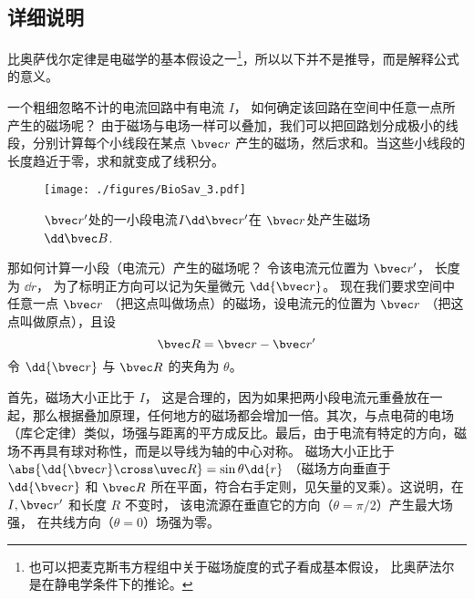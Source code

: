 \subsection{详细说明}
比奥萨伐尔定律是电磁学的基本假设之一\footnote{也可以把麦克斯韦方程组中关于磁场旋度的式子看成基本假设， 比奥萨法尔是在静电学条件下的推论。}，所以以下并不是推导，而是解释公式的意义。

一个粗细忽略不计的电流回路中有电流 $I$， 如何确定该回路在空间中任意一点所产生的磁场呢？ 由于磁场与电场一样可以叠加，我们可以把回路划分成极小的线段，分别计算每个小线段在某点 $\bvec r$ 产生的磁场，然后求和。当这些小线段的长度趋近于零，求和就变成了线积分。

\begin{figure}[ht]
\centering
\texttt{[image: ./figures/BioSav\_3.pdf]}
\caption{$\bvec r'$处的一小段电流$I \dd \bvec r'$在 $\bvec r$处产生磁场 $\dd \bvec B$.} \label{BioSav_fig3}
\end{figure}

那如何计算一小段（电流元）产生的磁场呢？ 令该电流元位置为 $\bvec r'$， 长度为 $\dd{r}$， 为了标明正方向可以记为矢量微元 $\dd{\bvec r}$。 现在我们要求空间中任意一点 $\bvec r$ （把这点叫做场点）的磁场，设电流元的位置为 $\bvec r$ （把这点叫做原点），且设
\begin{equation}
\bvec R = \bvec r - \bvec r'
\end{equation}
令 $\dd{\bvec r}$ 与 $\bvec R$ 的夹角为 $\theta$。

首先，磁场大小正比于 $I$， 这是合理的，因为如果把两小段电流元重叠放在一起，那么根据叠加原理，任何地方的磁场都会增加一倍。其次，与点电荷的电场（库仑定律）类似，场强与距离的平方成反比。最后，由于电流有特定的方向，磁场不再具有球对称性，而是以导线为轴的中心对称。 磁场大小正比于 $\abs{\dd{\bvec r} \cross \uvec R} = \sin\theta \dd{r}$ （磁场方向垂直于 $\dd{\bvec r}$ 和 $\bvec R$ 所在平面，符合右手定则，见矢量的叉乘）。这说明，在 $I, \bvec r'$ 和长度 $R$ 不变时， 该电流源在垂直它的方向（$\theta  = \pi /2$）产生最大场强， 在共线方向（$\theta  = 0$）场强为零。

